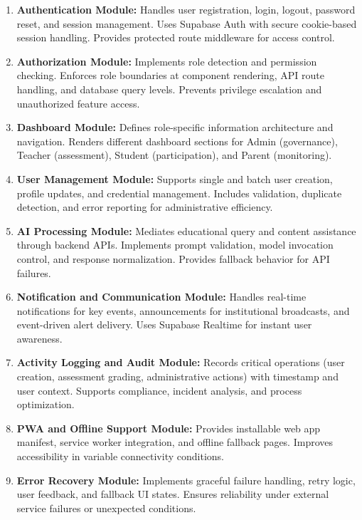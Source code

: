 \documentclass[11pt,a4paper]{article}
\begin{document}
\begin{enumerate}
    \item \textbf{Authentication Module:} Handles user registration, login, logout, password reset, and session management. Uses Supabase Auth with secure cookie-based session handling. Provides protected route middleware for access control.

    \item \textbf{Authorization Module:} Implements role detection and permission checking. Enforces role boundaries at component rendering, API route handling, and database query levels. Prevents privilege escalation and unauthorized feature access.

    \item \textbf{Dashboard Module:} Defines role-specific information architecture and navigation. Renders different dashboard sections for Admin (governance), Teacher (assessment), Student (participation), and Parent (monitoring).

    \item \textbf{User Management Module:} Supports single and batch user creation, profile updates, and credential management. Includes validation, duplicate detection, and error reporting for administrative efficiency.

    \item \textbf{AI Processing Module:} Mediates educational query and content assistance through backend APIs. Implements prompt validation, model invocation control, and response normalization. Provides fallback behavior for API failures.

    \item \textbf{Notification and Communication Module:} Handles real-time notifications for key events, announcements for institutional broadcasts, and event-driven alert delivery. Uses Supabase Realtime for instant user awareness.

    \item \textbf{Activity Logging and Audit Module:} Records critical operations (user creation, assessment grading, administrative actions) with timestamp and user context. Supports compliance, incident analysis, and process optimization.

    \item \textbf{PWA and Offline Support Module:} Provides installable web app manifest, service worker integration, and offline fallback pages. Improves accessibility in variable connectivity conditions.

    \item \textbf{Error Recovery Module:} Implements graceful failure handling, retry logic, user feedback, and fallback UI states. Ensures reliability under external service failures or unexpected conditions.
\end{enumerate}
\end{document}
